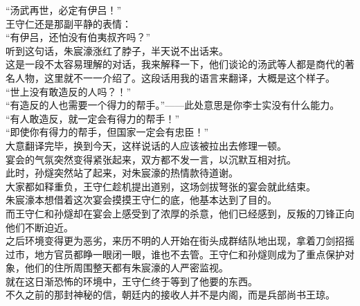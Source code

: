 \begin{multicols}{\theparacolNo}
“汤武再世，必定有伊吕！”\\

王守仁还是那副平静的表情：\\

“有伊吕，还怕没有伯夷叔齐吗？”\\

听到这句话，朱宸濠涨红了脖子，半天说不出话来。\\

这是一段不太容易理解的对话，我来解释一下，他们谈论的汤武等人都是商代的著名人物，这里就不一一介绍了。这段话用我的语言来翻译，大概是这个样子。\\

“世上没有敢造反的人吗？！”\\

“有造反的人也需要一个得力的帮手。”——此处意思是你李士实没有什么能力。\\

“有人敢造反，就一定会有得力的帮手！”\\

“即使你有得力的帮手，但国家一定会有忠臣！”\\

大意翻译完毕，换到今天，这样说话的人应该被拉出去修理一顿。\\

宴会的气氛突然变得紧张起来，双方都不发一言，以沉默互相对抗。\\

此时，孙燧突然站了起来，对朱宸濠的热情款待道谢。\\

大家都如释重负，王守仁趁机提出道别，这场剑拔弩张的宴会就此结束。\\

朱宸濠本想借着这次宴会摸摸王守仁的底，他基本达到了目的。\\

而王守仁和孙燧却在宴会上感受到了浓厚的杀意，他们已经感到，反叛的刀锋正向他们不断迫近。\\

之后环境变得更为恶劣，来历不明的人开始在街头成群结队地出现，拿着刀剑招摇过市，地方官员都睁一眼闭一眼，谁也不去管。王守仁和孙燧则成为了重点保护对象，他们的住所周围整天都有朱宸濠的人严密监视。\\

就在这日渐恐怖的环境中，王守仁终于等到了他要的东西。\\

不久之前的那封神秘的信，朝廷内的接收人并不是内阁，而是兵部尚书王琼。\\


\end{multicols}
